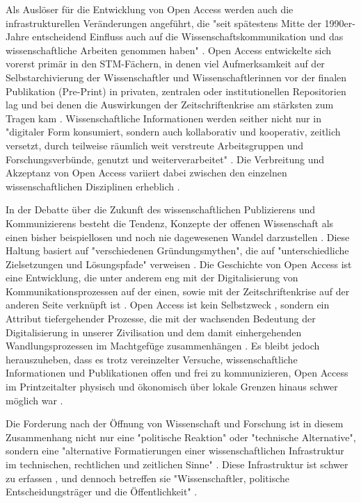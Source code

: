Als Auslöser für die Entwicklung von Open Access werden auch die infrastrukturellen Veränderungen angeführt, die "seit spätestens Mitte der 1990er-Jahre entscheidend Einfluss auch auf die Wissenschaftskommunikation und das wissenschaftliche Arbeiten genommen haben" \cite{schulze_2013_open}. Open Access entwickelte sich vorerst primär in den STM-Fächern, in denen viel Aufmerksamkeit auf der Selbstarchivierung der Wissenschaftler und Wissenschaftlerinnen vor der finalen Publikation (Pre-Print) in privaten, zentralen oder institutionellen Repositorien lag \cite{adema_2013_political} und bei denen die Auswirkungen der Zeitschriftenkrise am stärksten zum Tragen kam \cite{naeder_2010_open}. Wissenschaftliche Informationen werden seither nicht nur in "digitaler Form konsumiert, sondern auch kollaborativ und kooperativ, zeitlich versetzt, durch teilweise räumlich weit verstreute Arbeitsgruppen und Forschungsverbünde, genutzt und weiterverarbeitet" \cite{schulze_2013_open}. Die Verbreitung und Akzeptanz von Open Access variiert dabei zwischen den einzelnen wissenschaftlichen Disziplinen erheblich \cite{cite:21a}.

In der Debatte über die Zukunft des wissenschaftlichen Publizierens und Kommunizierens besteht die Tendenz, Konzepte der offenen Wissenschaft als einen bisher beispiellosen und noch nie dagewesenen Wandel darzustellen \cite{cite:17a} \cite{cite:17b}. Diese Haltung basiert auf "verschiedenen Gründungsmythen", die auf "unterschiedliche Zielsetzungen und Lösungspfade" verweisen \cite{suchen-Hoffmann-Zugang-undVerwertung-oeffentlicher-Informationen}. Die Geschichte von Open Access ist eine Entwicklung, die unter anderem eng mit der Digitalisierung von Kommunikationsprozessen auf der einen, sowie mit der Zeitschriftenkrise auf der anderen Seite verknüpft ist \cite{suchen-Hoffmann-Zugang-undVerwertung-oeffentlicher-Informationen} \cite{yiotis_2013_open} \cite{wein_2010_erwerbung}. Open Access ist kein Selbstzweck \cite{cite:17d}, sondern ein Attribut tiefergehender Prozesse, die mit der wachsenden Bedeutung der Digitalisierung in unserer Zivilisation und dem damit einhergehenden Wandlungsprozessen im Machtgefüge zusammenhängen \cite{cite:17e}. Es bleibt jedoch herauszuheben, dass es trotz vereinzelter Versuche, wissenschaftliche Informationen und Publikationen offen und frei zu kommunizieren, Open Access im Printzeitalter physisch und ökonomisch über lokale Grenzen hinaus schwer möglich war \cite{cite:18a}.

Die Forderung nach der Öffnung von Wissenschaft und Forschung ist in diesem Zusammenhang nicht nur eine "politische Reaktion" oder "technische Alternative", sondern eine "alternative Formatierungen einer wissenschaftlichen Infrastruktur im technischen, rechtlichen und zeitlichen Sinne" \cite{kelty_2004}. Diese Infrastruktur ist schwer zu erfassen \cite[:319]{bowker_2000_sorting}, und dennoch betreffen sie "Wissenschaftler, politische Entscheidungsträger und die Öffentlichkeit" \cite{Scheliga_2014}.

